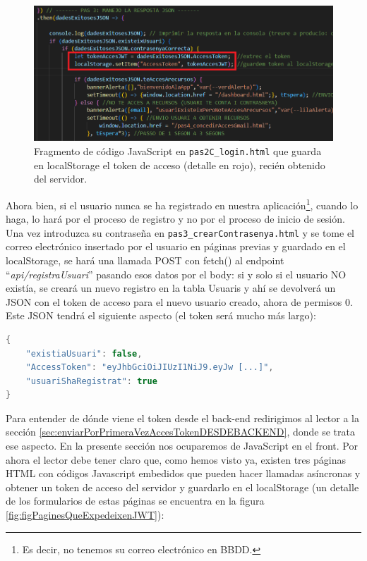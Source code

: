 \documentclass[a4paper,12pt]{report}
\begin{document}
	\setlength{\belowcaptionskip}{3pt}
	\FloatBarrier
	\begin{figure}[H]
		\centering
		\caption{Fragmento de código JavaScript en \texttt{pas2C\_login.html} que guarda en localStorage el token de acceso (detalle en rojo), recién obtenido del servidor.}
		\includegraphics[width=1\textwidth]{img/jwtFetchLoginFront.png}
		
		\label{fig:figuraLoginFetch} 
	\end{figure}
	\FloatBarrier
	
	
	
	Ahora bien, si el usuario nunca se ha registrado en nuestra aplicación\footnote{Es decir, no tenemos su correo electrónico en BBDD.}, cuando lo haga, lo hará por el proceso de registro y no por el proceso de inicio de sesión. Una vez introduzca su contraseña en \texttt{pas3\_crearContrasenya.html} y se tome el correo electrónico insertado por el usuario en páginas previas y guardado en el localStorage, se hará una llamada POST con fetch() al endpoint ``\textit{api/registraUsuari}'' pasando esos datos por el body: si y solo si el usuario NO existía, se creará un nuevo registro en la tabla Usuaris y ahí se devolverá un JSON con el token de acceso para el nuevo usuario creado, ahora de permisos 0. Este JSON tendrá el siguiente aspecto (el token será mucho más largo):
	
	
	
\begin{lstlisting}[language=Java, basicstyle=\ttfamily\footnotesize, keywordstyle=\color{magenta}]
{
	"existiaUsuari": false,
	"AccessToken": "eyJhbGciOiJIUzI1NiJ9.eyJw [...]",
	"usuariShaRegistrat": true
}
\end{lstlisting}
	
	
	Para entender de dónde viene el token desde el back-end redirigimos al lector a la sección \ref{sec:enviarPorPrimeraVezAccesTokenDESDEBACKEND}, donde se trata ese aspecto. En la presente sección nos ocuparemos de JavaScript en el front. Por ahora el lector debe tener claro que, como hemos visto ya, existen tres páginas HTML con códigos Javascript embedidos que pueden hacer llamadas asíncronas y obtener un token de acceso del servidor y guardarlo en el localStorage (un detalle de los formularios de estas páginas se encuentra en la figura \ref{fig:figPaginesQueExpedeixenJWT}):
	
\end{document}
